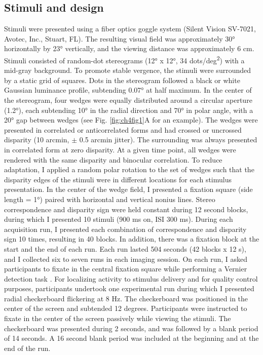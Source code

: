 \subsection{Stimuli and design}
Stimuli were presented using a fiber optics goggle system (Silent Vision SV-7021, Avotec, Inc., Stuart, FL). The resulting visual field was approximately \ang{30} horizontally by \ang{23} vertically, and the viewing distance was approximately 6 cm. Stimuli consisted of random-dot stereograms (\ang{12} x \ang{12}, 34 dots/deg\textsuperscript{2}) with a mid-gray background. To promote stable vergence, the stimuli were surrounded by a static grid of squares. Dots in the stereogram followed a black or white Gaussian luminance profile, subtending \ang{0.07} at half maximum. In the center of the stereogram, four wedges were equally distributed around a circular aperture (\ang{1.2}), each subtending \ang{10} in the radial direction and \ang{70} in polar angle, with a \ang{20} gap between wedges (see Fig. \ref{fig:ch4fig1}A for an example). The wedges were presented in correlated or anticorrelated forms and had crossed or uncrossed disparity (10 arcmin, $\pm$ 0.5 arcmin jitter). The surrounding was always presented in correlated form at zero disparity. At a given time point, all wedges were rendered with the same disparity and binocular correlation. To reduce adaptation, I applied a random polar rotation to the set of wedges such that the disparity edges of the stimuli were in different locations for each stimulus presentation. In the center of the wedge field, I presented a fixation square (side length =  \ang{1}) paired with horizontal and vertical nonius lines.
Stereo correspondence and disparity sign were held constant during 12 second blocks, during which I presented 10 stimuli (900 ms on, ISI 300 ms). During each acquisition run, I presented each combination of correspondence and disparity sign 10 times, resulting in 40 blocks. In addition, there was a fixation block at the start and the end of each run. Each run lasted 504 seconds (42 blocks x 12 s), and I collected six to seven runs in each imaging session. On each run, I asked participants to fixate in the central fixation square while performing a Vernier detection task \cite{Preston:2008dg}.
For localizing activity to stimulus delivery and for quality control purposes, participants undertook one experimental run during which I presented radial checkerboard flickering at 8 Hz. The checkerboard was positioned in the center of the screen and subtended 12 degrees. Participants were instructed to fixate in the center of the screen passively while viewing the stimuli. The checkerboard was presented during 2 seconds, and was followed by a blank period of 14 seconds. A 16 second blank period was included at the beginning and at the end of the run.

